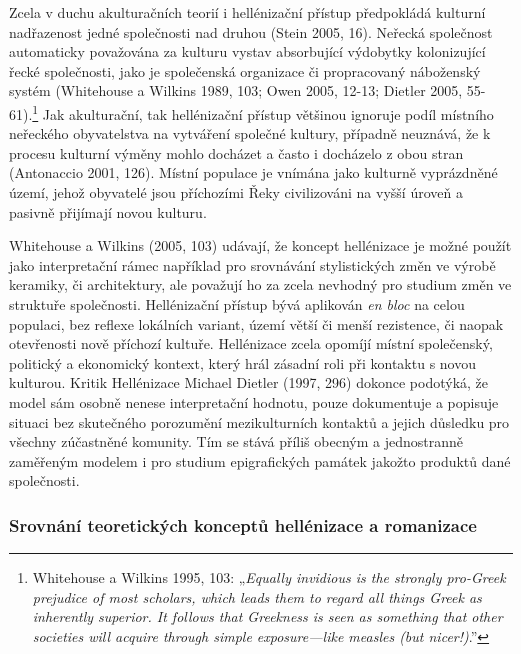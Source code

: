 Zcela v duchu akulturačních teorií i hellénizační přístup předpokládá kulturní nadřazenost jedné společnosti nad druhou (Stein 2005, 16). Neřecká společnost automaticky považována za kulturu vystav absorbující výdobytky kolonizující řecké společnosti, jako je společenská organizace či propracovaný náboženský systém (Whitehouse a Wilkins 1989, 103; Owen 2005, 12-13; Dietler 2005, 55-61).\footnote{Whitehouse a Wilkins 1995, 103: „{\em Equally invidious is the strongly pro-Greek prejudice of most scholars, which leads them to regard all things Greek as inherently superior. It follows that Greekness is seen as something that other societies will acquire through simple exposure---like measles (but nicer!)}.”} Jak akulturační, tak hellénizační přístup většinou ignoruje podíl místního neřeckého obyvatelstva na vytváření společné kultury, případně neuznává, že k procesu kulturní výměny mohlo docházet a často i docházelo z obou stran (Antonaccio 2001, 126). Místní populace je vnímána jako kulturně vyprázdněné území, jehož obyvatelé jsou příchozími Řeky civilizováni na vyšší úroveň a pasivně přijímají novou kulturu.

Whitehouse a Wilkins (2005, 103) udávají, že koncept hellénizace je možné použít jako interpretační rámec například pro srovnávání stylistických změn ve výrobě keramiky, či architektury, ale považují ho za zcela nevhodný pro studium změn ve struktuře společnosti. Hellénizační přístup bývá aplikován {\em en bloc} na celou populaci, bez reflexe lokálních variant, území větší či menší rezistence, či naopak otevřenosti nově příchozí kultuře. Hellénizace zcela opomíjí místní společenský, politický a ekonomický kontext, který hrál zásadní roli při kontaktu s novou kulturou. Kritik Hellénizace Michael Dietler (1997, 296) dokonce podotýká, že model sám osobně nenese interpretační hodnotu, pouze dokumentuje a popisuje situaci bez skutečného porozumění mezikulturních kontaktů a jejich důsledku pro všechny zúčastněné komunity. Tím se stává příliš obecným a jednostranně zaměřeným modelem i pro studium epigrafických památek jakožto produktů dané společnosti.

\subsubsection[srovnání-teoretických-konceptů-hellénizace-a-romanizace]{Srovnání teoretických konceptů hellénizace a romanizace}

